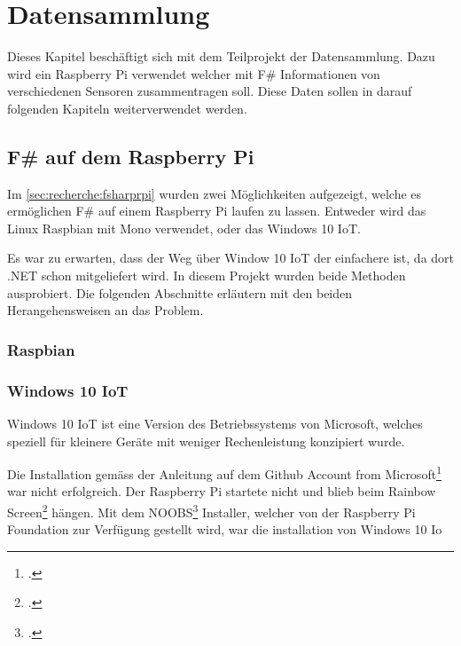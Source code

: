 
\chapter{Datensammlung}
Dieses Kapitel beschäftigt sich mit dem Teilprojekt der Datensammlung. 
Dazu wird ein Raspberry Pi verwendet welcher mit F\# Informationen von verschiedenen Sensoren zusammentragen soll.
Diese Daten sollen in darauf folgenden Kapiteln weiterverwendet werden.

\section{F\# auf dem Raspberry Pi}
Im \cref{sec:recherche:fsharprpi}  wurden zwei Möglichkeiten aufgezeigt, welche es ermöglichen F\# auf einem Raspberry Pi laufen zu lassen.
Entweder wird das Linux Raspbian mit Mono verwendet, oder das Windows 10 IoT.

Es war zu erwarten, dass der Weg über Window 10 IoT der einfachere ist, da dort .NET schon mitgeliefert wird. 
In diesem Projekt wurden beide Methoden ausprobiert. 
Die folgenden Abschnitte erläutern mit den beiden Herangehensweisen an das Problem.

\subsection{Raspbian}

\subsection{Windows 10 IoT}
Windows 10 IoT ist eine Version des Betriebssystems von Microsoft, welches speziell für kleinere Geräte mit weniger Rechenleistung konzipiert wurde.

Die Installation gemäss der Anleitung auf dem Github Account from Microsoft\footcite{install_win10iot_2016-04-25} war nicht erfolgreich. 
Der Raspberry Pi startete nicht und blieb beim Rainbow Screen\footcite{RPi_Rainbowscreen_2016-04-25} hängen. 
Mit dem NOOBS\footcite{NOOBS_2016-04-25} Installer, welcher von der Raspberry Pi Foundation zur Verfügung gestellt wird, war die installation von Windows 10 Io